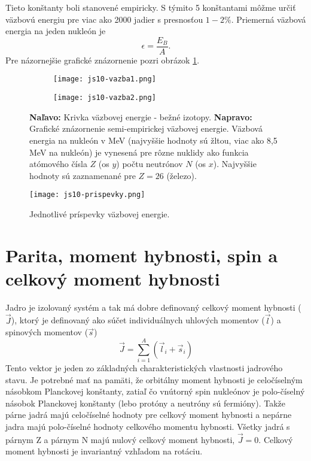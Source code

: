 \documentclass[../../main.tex]{subfiles}
\begin{document}
Tieto konštanty boli stanovené empiricky. S týmito 5 konštantami môžme určiť väzbovú energiu pre viac ako 2000 jadier s presnosťou $1-2\%$. Priemerná väzbová energia na jeden nukleón je 
$$ \epsilon=\frac{E_B}{A}.$$
Pre názornejšie grafické znázornenie pozri obrázok \ref{js10:vazby}.
\begin{figure}[h]
\begin{subfigure}[b]{0.45\textwidth}
\centering
\texttt{[image: js10-vazba1.png]}
\end{subfigure}
\begin{subfigure}[b]{0.45\textwidth}
\centering
\texttt{[image: js10-vazba2.png]}
\end{subfigure}
\caption{\textbf{Naľavo:} Krivka väzbovej energie - bežné izotopy. \textbf{Napravo:} Grafické znázornenie semi-empirickej väzbovej energie. Väzbová energia na nukleón v MeV (najvyššie hodnoty sú žltou, viac ako 8,5 MeV na nukleón) je vynesená pre rôzne nuklidy ako funkcia atómového čísla $Z$ (os $y$) počtu neutrónov $N$ (os $x$). Najvyššie hodnoty sú zaznamenané pre $Z=26$ (železo).}
\label{js10:vazby}
\end{figure}
\begin{figure}[h]
 \centerline{\texttt{[image: js10-prispevky.png]}}
 \caption{Jednotlivé príspevky väzbovej energie.}
 \label{js10:prispevky}
\end{figure}

\section{Parita, moment hybnosti, spin a celkový moment hybnosti}
Jadro je izolovaný systém a tak má dobre definovaný celkový moment hybnosti ($\vec{J}$), ktorý je definovaný ako súčet individuálnych uhlových momentov ($\vec{l}$) a spinových momentov ($\vec{s}$)
\begin{equation}
\vec{J}=\sum_{i=1}^{A}(\vec{l}_i+\vec{s}_i) 
\end{equation}
Tento vektor je jeden zo základných charakteristických vlastnosti jadrového stavu. Je potrebné mať na pamäti, že orbitálny moment hybnosti je celočíselným násobkom Planckovej konštanty, zatiaľ čo vnútorný spin nukleónov je polo-číselný násobok Planckovej konštanty (lebo protóny a neutróny sú fermióny). Takže párne jadrá majú celočíselné hodnoty pre celkový moment hybnosti a nepárne jadra majú polo-číselné hodnoty celkového momentu hybnosti. Všetky jadrá s párnym Z a párnym N majú nulový celkový moment hybnosti, $\vec{J}=0$. Celkový moment hybnosti je invariantný vzhľadom na rotáciu.
\end{document}
